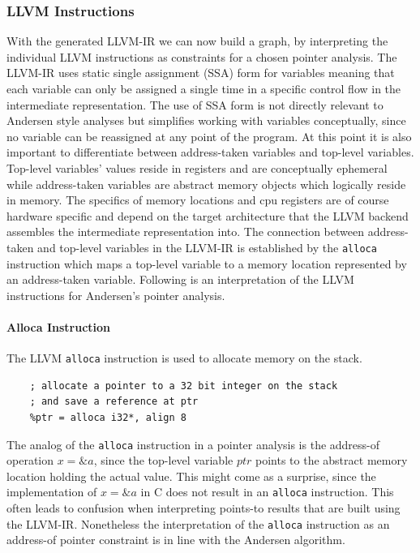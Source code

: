 \subsubsection{LLVM Instructions}
With the generated LLVM-IR we can now build a graph, by interpreting the individual LLVM instructions as constraints for a chosen pointer analysis.
The LLVM-IR uses static single assignment (SSA) form for variables meaning that each variable can only be assigned a single time in a specific control flow in the intermediate representation.
The use of SSA form is not directly relevant to Andersen style analyses but simplifies working with variables conceptually, since no variable can be reassigned at any point of the program.
At this point it is also important to differentiate between address-taken variables and top-level variables.
Top-level variables' values reside in registers and are conceptually ephemeral while address-taken variables are abstract memory objects which logically reside in memory. The specifics of memory locations and cpu registers are of course hardware specific and depend on the target architecture that the LLVM backend assembles the intermediate representation into.
The connection between address-taken and top-level variables in the LLVM-IR is established by the \verb|alloca| instruction which maps a top-level variable to a memory location represented by an address-taken variable.
Following is an interpretation of the LLVM instructions for Andersen's pointer analysis.

\paragraph{Alloca Instruction}
The LLVM \verb|alloca| instruction is used to allocate memory on the stack.
\begin{verbatim}
    ; allocate a pointer to a 32 bit integer on the stack 
    ; and save a reference at ptr
    %ptr = alloca i32*, align 8
\end{verbatim}
The analog of the \verb|alloca| instruction in a pointer analysis is the address-of operation $x = \&a$, since the top-level variable $ptr$ points to the abstract memory location holding the actual value.
This might come as a surprise, since the implementation of $x = \&a$ in C does not result in an \verb|alloca| instruction. This often leads to confusion when interpreting points-to results that are built using the LLVM-IR. Nonetheless the interpretation of the \verb|alloca| instruction as an address-of pointer constraint is in line with the Andersen algorithm.

